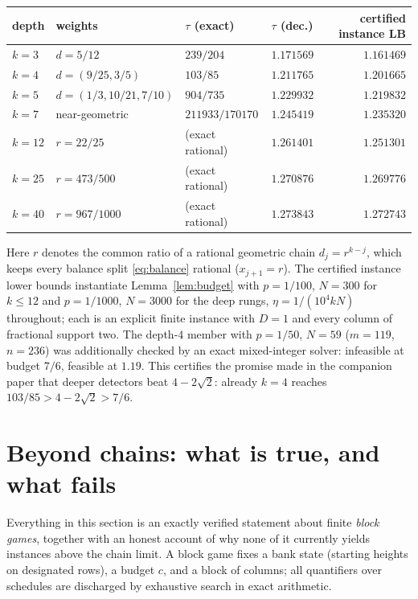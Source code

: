 \documentclass[11pt]{article}
\theoremstyle{definition}
\begin{document}
\begin{center}
\begin{tabular}{@{}llllr@{}}
\toprule
depth & weights & $\tau$ (exact) & $\tau$ (dec.) & certified instance LB\\
\midrule
$k=3$ & $d=5/12$ & $239/204$ & $1.171569$ & $1.161469$\\
$k=4$ & $d=(9/25,3/5)$ & $103/85$ & $1.211765$ & $1.201665$\\
$k=5$ & $d=(1/3,10/21,7/10)$ & $904/735$ & $1.229932$ & $1.219832$\\
$k=7$ & near-geometric & $211933/170170$ & $1.245419$ & $1.235320$\\
$k=12$ & $r=22/25$ & (exact rational) & $1.261401$ & $1.251301$\\
$k=25$ & $r=473/500$ & (exact rational) & $1.270876$ & $1.269776$\\
$k=40$ & $r=967/1000$ & (exact rational) & $1.273843$ & $\mathbf{1.272743}$\\
\bottomrule
\end{tabular}
\end{center}

\noindent
Here $r$ denotes the common ratio of a rational geometric chain
$d_j=r^{k-j}$, which keeps every balance split \eqref{eq:balance} rational
($x_{j+1}=r$).  The certified instance lower bounds instantiate
Lemma~\ref{lem:budget} with $p=1/100$, $N=300$ for $k\le12$ and
$p=1/1000$, $N=3000$ for the deep rungs, $\eta=1/(10^4kN)$ throughout;
each is an explicit finite instance with $D=1$ and every column of
fractional support two.  The depth-$4$ member with $p=1/50$, $N=59$
($m=119$, $n=236$) was additionally checked by an exact mixed-integer
solver: infeasible at budget $7/6$, feasible at $1.19$.  This certifies
the promise made in the companion paper that deeper detectors beat
$4-2\sqrt2$: already $k=4$ reaches $103/85>4-2\sqrt2>7/6$.

\section{Beyond chains: what is true, and what fails}\label{sec:beyond}

Everything in this section is an exactly verified statement about finite
\emph{block games}, together with an honest account of why none of it
currently yields instances above the chain limit.  A block game fixes a
bank state (starting heights on designated rows), a budget $c$, and a
block of columns; all quantifiers over schedules are discharged by
exhaustive search in exact arithmetic.
\end{document}
